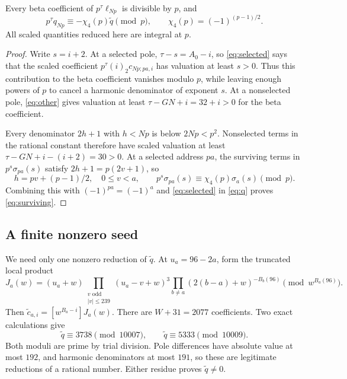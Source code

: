 \begin{proposition}\label{prop:surviving}
Every beta coefficient of $p^\tau\ell_{Np}$ is divisible by $p$,
and
\begin{equation}\label{eq:surviving}
 p^\tau q_{Np}\equiv-\chi_4(p)\widetilde q\pmod p,
 \qquad \chi_4(p)=(-1)^{(p-1)/2}.
\end{equation}
All scaled quantities reduced here are integral at $p$.
\end{proposition}
\begin{proof}
Write $s=i+2$. At a selected pole, $\tau-s=A_0-i$, so
\eqref{eq:selected} says that the scaled coefficient
$p^\tau(i)_2c_{Np;pa,i}$ has valuation at least $s>0$.
Thus this contribution to the beta coefficient vanishes modulo $p$,
while leaving enough powers of $p$ to cancel a harmonic denominator
of exponent $s$.
At a nonselected pole, \eqref{eq:other} gives valuation at least
$\tau-GN+i=32+i>0$ for the beta coefficient.

Every denominator $2h+1$ with $h<Np$ is below $2Np<p^2$.
Nonselected terms in the rational constant therefore have scaled
valuation at least $\tau-GN+i-(i+2)=30>0$. At a selected address
$pa$, the surviving terms in $p^s\sigma_{pa}(s)$ satisfy
$2h+1=p(2v+1)$, so
\[
 h=pv+(p-1)/2,\quad 0\le v<a,\qquad
 p^s\sigma_{pa}(s)\equiv\chi_4(p)\sigma_a(s)\pmod p.
\]
Combining this with $(-1)^{pa}=(-1)^a$ and
\eqref{eq:selected} in \eqref{eq:q} proves \eqref{eq:surviving}.
\end{proof}

\subsection{A finite nonzero seed}
We need only one nonzero reduction of $\widetilde q$. At
$u_a=96-2a$, form the truncated local product
\begin{equation}\label{eq:seed-jet}
 J_a(w)=(u_a+w)\prod_{\substack{v\text{ odd}\\|v|\le239}}
 (u_a-v+w)^3\prod_{b\ne a}(2(b-a)+w)^{-B_b(96)}
                         \pmod{w^{B_a(96)}}.
\end{equation}
Then $\widetilde c_{a,i}=[w^{B_a-i}]J_a(w)$. There are
$W+31=2077$ coefficients. Two exact calculations give
\begin{equation}\label{eq:seed-residues}
 \widetilde q\equiv3738\pmod{10007},\qquad
 \widetilde q\equiv5333\pmod{10009}.
\end{equation}
Both moduli are prime by trial division. Pole differences have
absolute value at most $192$, and harmonic denominators at most
$191$, so these are legitimate reductions of a rational number.
Either residue proves $\widetilde q\ne0$.

